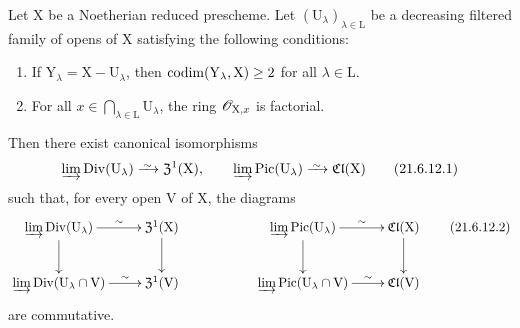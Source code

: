 \begin{proposition}[21.6.12]
\label{IV.21.6.12}
Let $\mathrm{X}$ be a Noetherian reduced prescheme.
Let $(\mathrm{U}_\lambda)_{\lambda\in\mathrm{L}}$ be a decreasing filtered family of opens of $\mathrm{X}$ satisfying the following conditions:
\begin{enumerate}
  \item[\rm 1\textsuperscript{o}] If $\mathrm{Y}_\lambda=\mathrm{X}-\mathrm{U}_\lambda$, then $\operatorname{codim}(\mathrm{Y}_\lambda,\mathrm{X})\geq 2$ for all $\lambda\in\mathrm{L}$.
  \item[\rm 2\textsuperscript{o}] For all $x\in\bigcap_{\lambda\in\mathrm{L}}\mathrm{U}_\lambda$, the ring $\mathscr{O}_{\mathrm{X},x}$ is factorial.
\end{enumerate}
Then there exist canonical isomorphisms
\[
\label{IV.21.6.12.1}
  \varinjlim\operatorname{Div}(\mathrm{U}_\lambda)\simto\mathfrak{Z}^1(\mathrm{X}),\qquad
  \varinjlim\operatorname{Pic}(\mathrm{U}_\lambda)\simto\mathfrak{Cl}(\mathrm{X})
  \tag{21.6.12.1}
\]
such that, for every open $\mathrm{V}$ of $\mathrm{X}$, the diagrams
\[
\label{IV.21.6.12.2}
  \xymatrix{
    \varinjlim\operatorname{Div}(\mathrm{U}_\lambda) \ar[r]^-\sim \ar[d] & \mathfrak{Z}^1(\mathrm{X}) \ar[d] & & \varinjlim\operatorname{Pic}(\mathrm{U}_\lambda) \ar[r]^-\sim \ar[d] & \mathfrak{Cl}(\mathrm{X}) \ar[d]\\
    \varinjlim\operatorname{Div}(\mathrm{U}_\lambda\cap\mathrm{V}) \ar[r]^-\sim & \mathfrak{Z}^1(\mathrm{V}) & & \varinjlim\operatorname{Pic}(\mathrm{U}_\lambda\cap\mathrm{V}) \ar[r]^-\sim & \mathfrak{Cl}(\mathrm{V})
  }
  \tag{21.6.12.2}
\]
are commutative.
\end{proposition}

